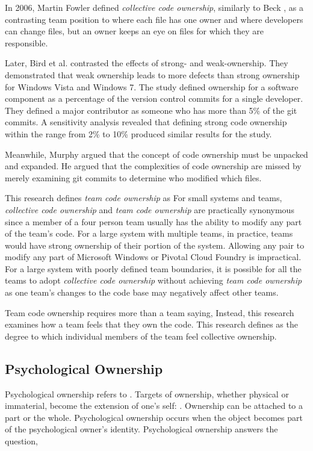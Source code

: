 In 2006, Martin Fowler defined \textit{collective code ownership}, similarly to Beck \cite{FowlerCodeOwnership}, as a contrasting team position to  where each file has one owner and  where developers can change files, but an owner keeps an eye on files for which they are responsible. 

Later, Bird et al. \cite{BirdDontTouchMyCode} contrasted the effects of strong- and weak-ownership. They demonstrated that weak ownership leads to more defects than strong ownership for Windows Vista and Windows 7. The study defined ownership for a software component as a percentage of the version control commits for a single developer. They defined a major contributor as someone who has more than 5\% of the git commits. A sensitivity analysis revealed that defining strong code ownership within the range from 2\% to 10\% produced similar results for the study.

Meanwhile, Murphy  \cite{MurphyIEEESoftware} argued that the concept of code ownership must be unpacked and expanded. He argued that the complexities of code ownership are missed by merely examining git commits to determine who modified which files.

This research defines \textit{team code ownership} as  For small systems and teams, \textit{collective code ownership} and \textit{team code ownership} are practically synonymous since a member of a four person team usually has the ability to modify any part of the team's code. For a large system with multiple teams, in practice, teams would have strong ownership of their portion of the system. Allowing any pair to modify any part of Microsoft Windows or Pivotal Cloud Foundry is impractical. For a large system with poorly defined team boundaries, it is possible for all the teams to adopt \textit{collective code ownership} without achieving \textit{team code ownership} as one team's changes to the code base may negatively affect other teams.

Team code ownership requires more than a team saying,  Instead, this research examines how a team feels that they own the code. This research defines  as the degree to which individual members of the team feel collective ownership.  

\subsection{Psychological Ownership}
Psychological ownership refers to  \cite{Pierce2001}. Targets of ownership, whether physical or immaterial, become the extension of one's self:  \cite{Isaacs1933}. Ownership can be attached to a part or the whole. Psychological ownership occurs when the object becomes part of the psychological owner's identity. Psychological ownership answers the question, 

